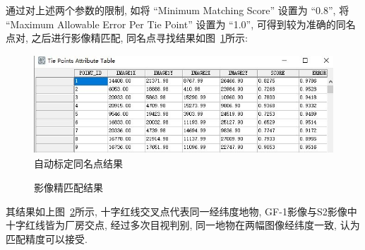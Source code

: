 通过对上述两个参数的限制, 如将 ``Minimum Matching Score'' 设置为 ``0.8'', 将 ``Maximum Allowable Error Per Tie Point'' 设置为 ``1.0'', 可得到较为准确的同名点对, 之后进行影像精匹配, 同名点寻找结果如图~\ref{fig:0213}所示:

\begin{figure}[!htbp]
    \centering
    \includegraphics[height=10em]{pic/q4_08.jpg}
    \caption{自动标定同名点结果}
    \label{fig:0213}
\end{figure}

\begin{figure}[!htbp]
    \centering
    \qquad
    \caption{影像精匹配结果}
    \label{fig:0214}
\end{figure}

其结果如上图~\ref{fig:0214}所示, 十字红线交叉点代表同一经纬度地物, GF-1影像与S2影像中十字红线皆为厂房交点, 经过多次目视判别, 同一地物在两幅图像经纬度一致, 认为匹配精度可以接受. 

